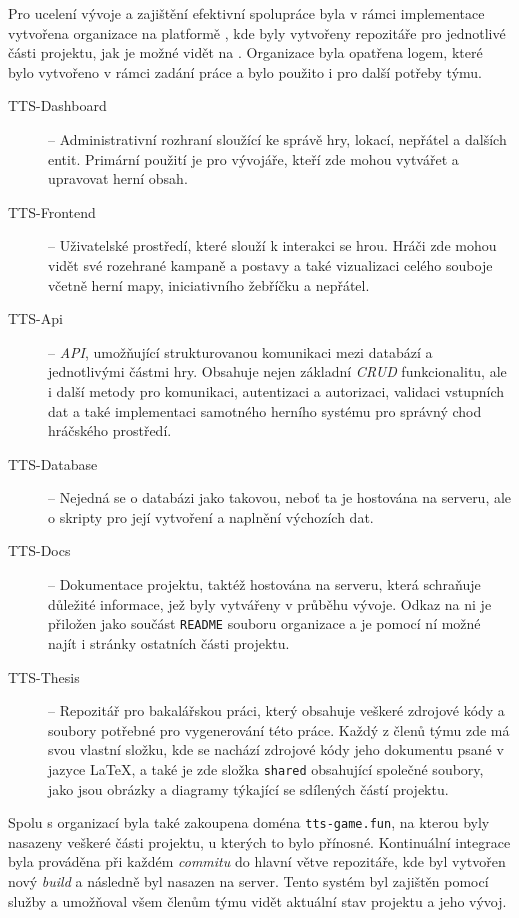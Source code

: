 Pro ucelení vývoje a zajištění efektivní spolupráce byla v rámci implementace vytvořena organizace  na platformě , kde byly vytvořeny repozitáře pro jednotlivé části projektu, jak je možné vidět na . Organizace byla opatřena logem, které bylo vytvořeno v rámci zadání práce a bylo použito i pro další potřeby týmu.

\begin{description}
    \item [TTS-Dashboard] -- Administrativní rozhraní sloužící ke správě hry, lokací, nepřátel a dalších entit. Primární použití je pro vývojáře, kteří zde mohou vytvářet a upravovat herní obsah.
    \item [TTS-Frontend] -- Uživatelské prostředí, které slouží k interakci se hrou. Hráči zde mohou vidět své rozehrané kampaně a postavy a také vizualizaci celého souboje včetně herní mapy, iniciativního žebříčku a nepřátel.
    \item [TTS-Api] -- \textit{API}, umožňující strukturovanou komunikaci mezi databází a jednotlivými částmi hry. Obsahuje nejen základní \textit{CRUD} funkcionalitu, ale i další metody pro komunikaci, autentizaci a autorizaci, validaci vstupních dat a také implementaci samotného herního systému pro správný chod hráčského prostředí.
    \item [TTS-Database] -- Nejedná se o databázi jako takovou, neboť ta je hostována na serveru, ale o skripty pro její vytvoření a naplnění výchozích dat.
    \item [TTS-Docs] -- Dokumentace projektu, taktéž hostována na serveru, která schraňuje důležité informace, jež byly vytvářeny v průběhu vývoje. Odkaz na ni je přiložen jako součást \texttt{README} souboru organizace a je pomocí ní možné najít i stránky ostatních části projektu.
    \item [TTS-Thesis] -- Repozitář pro bakalářskou práci, který obsahuje veškeré zdrojové kódy a soubory potřebné pro vygenerování této práce. Každý z členů týmu zde má svou vlastní složku, kde se nachází zdrojové kódy jeho dokumentu psané v jazyce \LaTeX, a také je zde složka \texttt{shared} obsahující společné soubory, jako jsou obrázky a diagramy týkající se sdílených částí projektu.
\end{description}

Spolu s organizací byla také zakoupena doména \texttt{tts-game.fun}, na kterou byly nasazeny veškeré části projektu, u kterých to bylo přínosné. Kontinuální integrace byla prováděna při každém \textit{commitu} do hlavní větve repozitáře, kde byl vytvořen nový \textit{build} a následně byl nasazen na server. Tento systém byl zajištěn pomocí služby  a umožňoval všem členům týmu vidět aktuální stav projektu a jeho vývoj.

